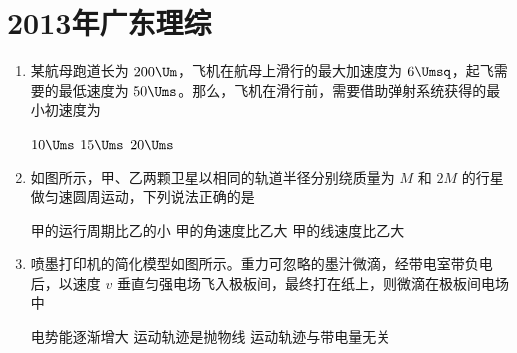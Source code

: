 \documentclass[\gkver]{gaokaozhenti}
\begin{document}
\chapter{2013年广东理综}

\begin{enumerate}
\item
某航母跑道长为 $200\Um$，飞机在航母上滑行的最大加速度为 $6\Umsq$，起飞需要的最低速度为 $50\Ums$。那么，飞机在滑行前，需要借助弹射系统获得的最小初速度为

\fourchoices[answer=B]
{$5\Ums$}
{$10\Ums$}
{$15\Ums$}
{$20\Ums$}


\item
如图所示，甲、乙两颗卫星以相同的轨道半径分别绕质量为 $M$ 和 $2M$ 的行星做匀速圆周运动，下列说法正确的是


{甲的运行周期比乙的小}
{甲的角速度比乙大}
{甲的线速度比乙大}


\item
喷墨打印机的简化模型如图所示。重力可忽略的墨汁微滴，经带电室带负电后，以速度 $v$ 垂直匀强电场飞入极板间，最终打在纸上，则微滴在极板间电场中


{电势能逐渐增大}
{运动轨迹是抛物线}
{运动轨迹与带电量无关}



\end{enumerate}
\end{document}

